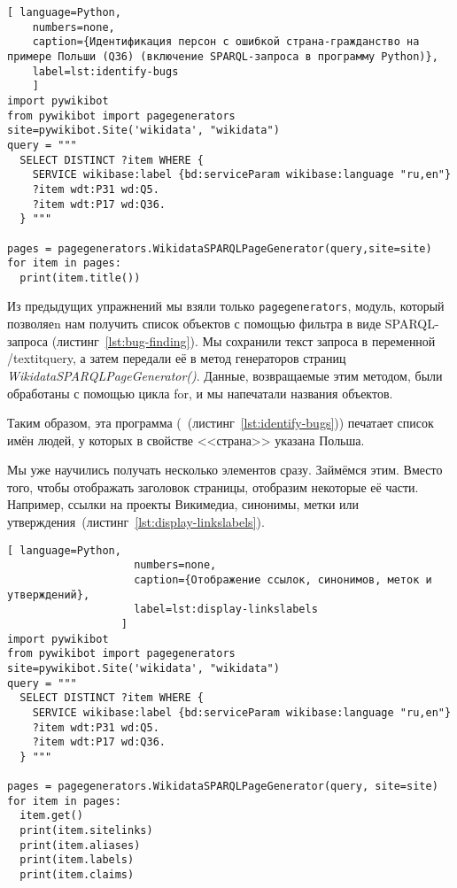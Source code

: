 \begin{fullwidth}
\begin{lstlisting}[ language=Python,
    numbers=none,
    caption={Идентификация персон с ошибкой страна-гражданство на примере Польши (Q36) (включение SPARQL-запроса в программу Python)},
    label=lst:identify-bugs
    ]
import pywikibot
from pywikibot import pagegenerators
site=pywikibot.Site('wikidata', "wikidata")
query = """
  SELECT DISTINCT ?item WHERE {
    SERVICE wikibase:label {bd:serviceParam wikibase:language "ru,en"}
    ?item wdt:P31 wd:Q5.
    ?item wdt:P17 wd:Q36.
  } """

pages = pagegenerators.WikidataSPARQLPageGenerator(query,site=site)
for item in pages:
  print(item.title())
\end{lstlisting}    
\end{fullwidth}

Из предыдущих упражнений мы взяли только \lstinline|pagegenerators|, модуль, который позволяеn нам получить список объектов с помощью фильтра в виде SPARQL-запроса (листинг~\ref{lst:bug-finding}). Мы сохранили текст запроса в переменной /textit{query}, а затем передали её в метод генераторов страниц \textit{WikidataSPARQLPageGenerator()}. Данные, возвращаемые этим методом, были обработаны с помощью цикла for, и мы напечатали названия объектов.

Таким образом, эта программа (~(листинг~\ref{lst:identify-bugs})) печатает список имён людей, у которых в свойстве <<страна>> указана Польша.

Мы уже научились получать несколько элементов сразу. Займёмся этим. Вместо того, чтобы отображать заголовок страницы, отобразим некоторые её части. Например, ссылки на проекты Викимедиа, синонимы, метки или утверждения~(листинг~\ref{lst:display-linkslabels}).

\begin{lstlisting}[ language=Python,
                    numbers=none,
                    caption={Отображение ссылок, синонимов, меток и утверждений},
                    label=lst:display-linkslabels
                  ]
import pywikibot
from pywikibot import pagegenerators
site=pywikibot.Site('wikidata', "wikidata")
query = """
  SELECT DISTINCT ?item WHERE {
    SERVICE wikibase:label {bd:serviceParam wikibase:language "ru,en"}
    ?item wdt:P31 wd:Q5.
    ?item wdt:P17 wd:Q36.
  } """

pages = pagegenerators.WikidataSPARQLPageGenerator(query, site=site)
for item in pages:
  item.get()
  print(item.sitelinks)
  print(item.aliases)
  print(item.labels)
  print(item.claims)
\end{lstlisting} 

